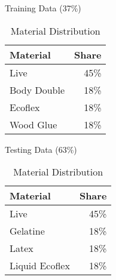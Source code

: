 \begin{table}[htb]
    \centering

    \begin{minipage}[r]{0.25\textwidth}
        \centering Training Data (37\%)
        
        \smallskip
        \begin{tabular}{ l r } \hline
            Material    & Share \\ \hline
            Live        & 45\%  \\
            Body Double & 18\%  \\
            Ecoflex     & 18\%  \\
            Wood Glue   & 18\%  \\ \hline
        \end{tabular}
    \end{minipage}
    \hspace{10mm}
    \begin{minipage}[r]{0.25\textwidth}
        \centering Testing Data (63\%)
        
        \smallskip
        \begin{tabular}{ l r } \hline
            Material        & Share \\ \hline
            Live            & 45\%  \\
            Gelatine        & 18\%  \\
            Latex           & 18\%  \\
            Liquid Ecoflex  & 18\%  \\ \hline
        \end{tabular}
    \end{minipage}

    \caption{Material Distribution}
\end{table}
